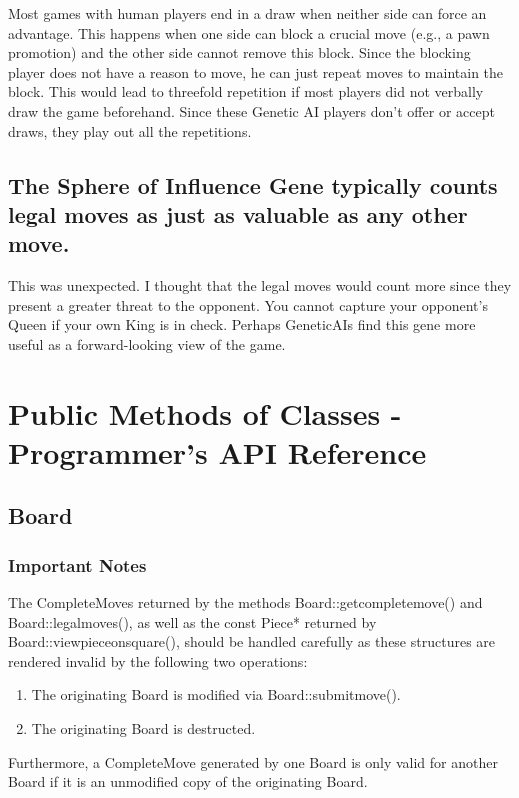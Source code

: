 \documentclass[letter]{article}
\newcommand{\code}[1]{#1}
\renewcommand\_{\textunderscore\allowbreak}
\begin{document}
Most games with human players end in a draw when neither side can force an advantage. This happens when one side can block a crucial move (e.g., a pawn promotion) and the other side cannot remove this block. Since the blocking player does not have a reason to move, he can just repeat moves to maintain the block. This would lead to threefold repetition if most players did not verbally draw the game beforehand. Since these Genetic AI players don't offer or accept draws, they play out all the repetitions.


\subsection*{The Sphere of Influence Gene typically counts legal moves as just as valuable as any other move.}

This was unexpected. I thought that the legal moves would count more since they present a greater threat to the opponent. You cannot capture your opponent's Queen if your own King is in check. Perhaps Genetic\_AIs find this gene more useful as a forward-looking view of the game.


\section{Public Methods of Classes - Programmer's API Reference}

\subsection{Board}
\subsubsection{Important Notes}
The \code{Complete\_Move}s returned by the methods \code{Board::get\_complete\_move()} and \code{Board::legal\_moves()}, as well as the \code{const Piece*} returned by \code{Board::view\_piece\_on\_square()}, should be handled carefully as these structures are rendered invalid by the following two operations:
\begin{enumerate}
	\item The originating \code{Board} is modified via \code{Board::submit\_move()}.
	\item The originating \code{Board} is destructed.
\end{enumerate}
Furthermore, a \code{Complete\_Move} generated by one \code{Board} is only valid for another \code{Board} if it is an unmodified copy of the originating \code{Board}.
\end{document}
